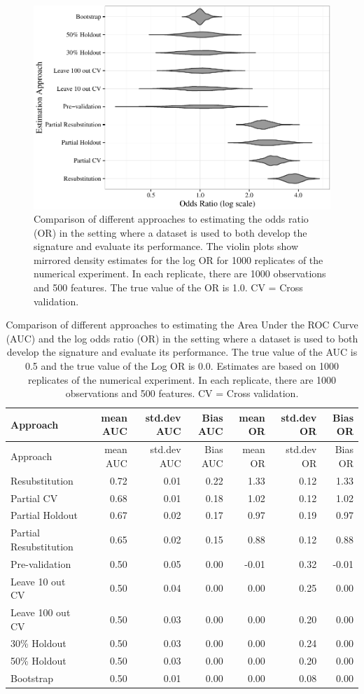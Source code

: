 \documentclass[12pt,]{article}
\begin{document}
\begin{figure}[htbp]
\centering
\includegraphics{paper_files/figure-latex/cvsims2-1.pdf}
\caption{Comparison of different approaches to estimating the odds ratio
(OR) in the setting where a dataset is used to both develop the
signature and evaluate its performance. The violin plots show mirrored
density estimates for the log OR for 1000 replicates of the numerical
experiment. In each replicate, there are 1000 observations and 500
features. The true value of the OR is 1.0. CV = Cross validation.
\label{fig2}}
\end{figure}

\begin{longtable}[c]{@{}lrrrrrr@{}}
\caption{Comparison of different approaches to estimating the Area Under
the ROC Curve (AUC) and the log odds ratio (OR) in the setting where a
dataset is used to both develop the signature and evaluate its
performance. The true value of the AUC is 0.5 and the true value of the
Log OR is 0.0. Estimates are based on 1000 replicates of the numerical
experiment. In each replicate, there are 1000 observations and 500
features. CV = Cross validation.}\tabularnewline
\toprule
Approach & mean AUC & std.dev AUC & Bias AUC & mean OR & std.dev OR &
Bias OR\tabularnewline
\midrule
\endfirsthead
\toprule
Approach & mean AUC & std.dev AUC & Bias AUC & mean OR & std.dev OR &
Bias OR\tabularnewline
\midrule
\endhead
Resubstitution & 0.72 & 0.01 & 0.22 & 1.33 & 0.12 & 1.33\tabularnewline
Partial CV & 0.68 & 0.01 & 0.18 & 1.02 & 0.12 & 1.02\tabularnewline
Partial Holdout & 0.67 & 0.02 & 0.17 & 0.97 & 0.19 & 0.97\tabularnewline
Partial Resubstitution & 0.65 & 0.02 & 0.15 & 0.88 & 0.12 &
0.88\tabularnewline
Pre-validation & 0.50 & 0.05 & 0.00 & -0.01 & 0.32 &
-0.01\tabularnewline
Leave 10 out CV & 0.50 & 0.04 & 0.00 & 0.00 & 0.25 & 0.00\tabularnewline
Leave 100 out CV & 0.50 & 0.03 & 0.00 & 0.00 & 0.20 &
0.00\tabularnewline
30\% Holdout & 0.50 & 0.03 & 0.00 & 0.00 & 0.24 & 0.00\tabularnewline
50\% Holdout & 0.50 & 0.03 & 0.00 & 0.00 & 0.20 & 0.00\tabularnewline
Bootstrap & 0.50 & 0.01 & 0.00 & 0.00 & 0.08 & 0.00\tabularnewline
\bottomrule
\end{longtable}
\end{document}
